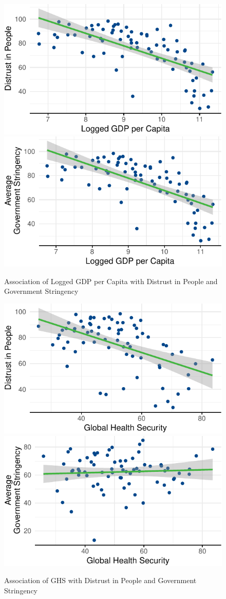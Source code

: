 \documentclass[
  11pt,
]{article}
\begin{document}
\begin{figure}
\includegraphics[width=0.48\linewidth]{write_up_test_files/figure-latex/gdp-plots-1} \includegraphics[width=0.48\linewidth]{write_up_test_files/figure-latex/gdp-plots-2} \caption{Association of Logged GDP per Capita with Distrust in People and Government Stringency}\label{fig:gdp-plots}
\end{figure}

\begin{figure}
\includegraphics[width=0.48\linewidth]{write_up_test_files/figure-latex/ghs-plots-1} \includegraphics[width=0.48\linewidth]{write_up_test_files/figure-latex/ghs-plots-2} \caption{Association of GHS with Distrust in People and Government Stringency}\label{fig:ghs-plots}
\end{figure}
\end{document}
